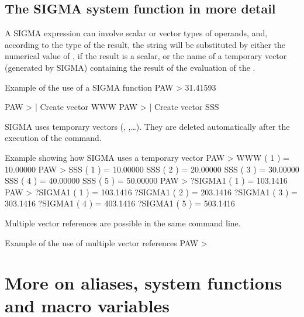 %
%
\newpage
\subsection{The \dollar SIGMA system function in more detail}


A SIGMA expression
can involve scalar or vector types of operands, and,
according to the type of the result,
the string 
will be substituted by either the numerical value of
, if the result
is a scalar, or the name of a temporary vector (generated by SIGMA)
containing the result of the evaluation of the
.

\begin{XMPt}{Example of the use of a SIGMA function}
 PAW > 
 31.41593
 
 PAW >                   | Create vector WWW
 PAW >       | Create vector SSS
\end{XMPt}

SIGMA uses temporary vectors (, ,\ldots).
They are deleted automatically after the execution of the command.

\begin{XMPt}{Example showing how SIGMA uses a temporary vector}
 PAW > 
 WWW (    1 ) =   10.00000       
 PAW > 
 SSS (    1 ) =   10.00000       
 SSS (    2 ) =   20.00000       
 SSS (    3 ) =   30.00000       
 SSS (    4 ) =   40.00000       
 SSS (    5 ) =   50.00000       
 PAW > 
 ?SIGMA1 (    1 ) =   103.1416
 PAW > 
 ?SIGMA1 (    1 ) =   103.1416
 ?SIGMA1 (    2 ) =   203.1416
 ?SIGMA1 (    3 ) =   303.1416
 ?SIGMA1 (    4 ) =   403.1416
 ?SIGMA1 (    5 ) =   503.1416
\end{XMPt}

Multiple vector references are possible in the same command line.
\begin{XMPt}{Example of the use of multiple vector references}
 PAW > 
\end{XMPt}
%
%
\newpage
\section{More on aliases, system functions and macro variables}

